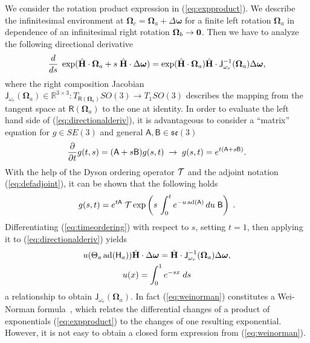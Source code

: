 \documentclass[journal]{IEEEtran}
\newcommand{\real}{\mathbb{R}}
\newcommand{\bfomega}{\boldsymbol{\omega}}
\newcommand{\bfOmega}{\boldsymbol{\Omega}}
\newcommand{\adj}[1]{\mathrm{ad}({#1})}
\newcommand{\beq}{\begin{equation}}
\newcommand{\eeq}{\end{equation}}
\begin{document}
We consider the rotation product expression in (\ref{eq:expproduct}). We
describe the infinitesimal environment at $\bfOmega_c = \bfOmega_a + \Delta\bfomega$
for a finite left rotation $\bfOmega_a$ in dependence of an infinitesimal right rotation $\bfOmega_b \rightarrow \bf 0$.
Then we have to analyze the following directional derivative
\beq
    {d\over ds}\;\exp(\hat{\bf H}\cdot\bfOmega_a + s\;\hat{\bf H}\cdot\Delta\bfomega)
    = \exp(\hat{\bf H}\cdot\bfOmega_a) \hat{\bf H}\cdot\mathsf{J}_{\omega_r}^{-1}(\bfOmega_a)
    \Delta\bfomega,
    \label{eq:directionalderiv}
\eeq
where the right composition Jacobian $\mathsf{J}_{\omega_r}(\bfOmega_a) \in \real^{3\times3}: 
T_{\mathsf{R}(\bfOmega_a)}SO(3)\rightarrow T_1SO(3)$ describes the
mapping from the tangent space at $\mathsf{R}(\bfOmega_a)$ to the one at identity.
In order to evaluate the left hand side of (\ref{eq:directionalderiv}), it is advantageous to
consider a ``matrix'' equation for $g\in SE(3)$ and general $\mathsf{A},\mathsf{B}\in \mathfrak{se}(3)$
\beq
    {\partial \over \partial t}g(t,s) = (\mathsf{A} + s\mathsf{B})g(s,t)\; \rightarrow \;
    g(s,t) = e^{t (\mathsf{A}+s\mathsf{B})}. \label{eq:SE3diff}
\eeq
With the help of the Dyson ordering operator ${\cal T}$ 
and the adjoint notation (\ref{eq:defadjoint}), it can be shown that the following holds
\beq
    g(s,t) = e^{t \mathsf{A}} \; {\cal T}\exp\left( s\,
    \int_0^t e^{-u\, \adj{\mathsf{A}}} \, du \; \mathsf{B} \right ) \; .
    \label{eq:timeordering}
\eeq
Differentiating (\ref{eq:timeordering}) with respect to $s$, setting $t=1$,
then applying it to (\ref{eq:directionalderiv}) yields
\begin{multline}
    u(\Theta_a\, \adj{\mathsf{H}_a} )
    \hat{\bf H}\cdot\Delta\bfomega = \hat{\bf H}\cdot \mathsf{J}_{\omega_r}^{-1}(\bfOmega_a)
    \Delta\bfomega,\\
    u(x)=\int_0^1 e^{-s x} \; ds
    \label{eq:weinorman}
\end{multline}
a relationship to obtain $\mathsf{J}_{\omega_r}(\bfOmega_a)$. In fact (\ref{eq:weinorman}) constitutes a
Wei-Norman formula~\cite{Wei-Norman}, which relates the differential changes of a product of
exponentials (\ref{eq:expproduct}) to the changes of one resulting exponential. However, it is not easy
to obtain a closed form expression from (\ref{eq:weinorman}).
\end{document}
